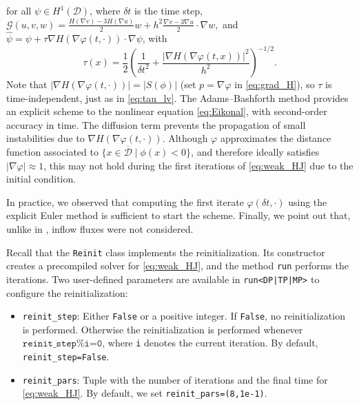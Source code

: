 \documentclass[preprint,9pt]{elsarticle}
\begin{document}
for all $\psi\in H^1(\mathcal{D})$, where $\delta t$ is the time step,
$
	\mathcal{G}(u, v, w) = \tfrac{H(\nabla v)-3H(\nabla u)}{2} w +
	h^2 \tfrac{\nabla v - 3\nabla u}{2} \cdot \nabla w,
$
and $\hat{\psi}=\psi+\tau\nabla H(\nabla\varphi(t,\cdot))\cdot\nabla\psi$, with 
\begin{equation}
	\tau(x) = \frac{1}{2}\left(\frac{1}{\delta t^2}  +
	\frac{|\nabla H(\nabla \varphi(t, x))|^2}{h^2}\right)^{-1/2}.
\end{equation}
Note that $|\nabla H(\nabla \varphi(t, \cdot))|=|S(\phi)|$
(set $p=\nabla\varphi$ in \eqref{eq:grad_H}),
so $\tau$ is time-independent, just as in \eqref{eq:tau_lv}.
The Adams--Bashforth method provides an explicit scheme
to the nonlinear equation \eqref{eq:Eikonal},
with second-order accuracy in time.
The diffusion term prevents the propagation of
small instabilities due to $\nabla H(\nabla \varphi (t, \cdot))$.
Although $\varphi$ approximates the distance function
associated to $\{x\in\overline{\mathcal{D}} \mid \phi(x)<0\}$, and
therefore ideally satisfies $|\nabla\varphi| \approx 1$,
this may not hold during the first iterations of \eqref{eq:weak_HJ}
due to the initial condition.

In practice, we observed that computing
the first iterate $\varphi(\delta t, \cdot)$
using the explicit Euler method is sufficient to start the scheme.
Finally, we point out that, unlike in \cite{MR1640142},
inflow fluxes were not considered.

Recall that the \texttt{Reinit} class implements the reinitialization.
Its constructor creates a precompiled solver for \eqref{eq:weak_HJ},
and the method \texttt{run} performs the iterations.
Two user-defined parameters are available in \texttt{run<DP|TP|MP>}
to configure the reinitialization:
\begin{itemize}
	\item \texttt{reinit\_step}:
	Either \texttt{False} or a positive integer.
	If \texttt{False}, no reinitialization is performed. Otherwise
	the reinitialization is performed whenever $\texttt{reinit\_step\%i=0}$, where
	\texttt{i} denotes the current iteration. By default, \texttt{reinit\_step=False}.
	\item \texttt{reinit\_pars}:
	Tuple with the number of iterations and the final time for \eqref{eq:weak_HJ}.
	By default, we set \texttt{reinit\_pars=(8,1e-1)}.
\end{itemize}
\end{document}
